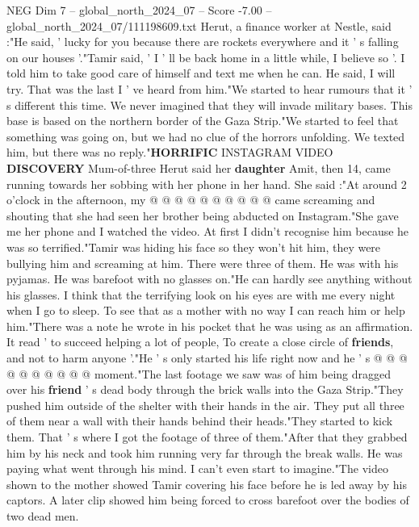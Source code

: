 \begin{textsample}{NEG Dim 7 – global\_north\_2024\_07 – Score -7.00 – global\_north\_2024\_07/111198609.txt}  \label{ex:f7_neg_120}
Herut, a finance worker at Nestle, said :"He said, ' lucky for you because there are rockets everywhere and it ' s falling on our houses '."Tamir said, ' I ' ll be back home in a little while, I believe so '.
I told him to take good care of himself and text me when he can.
He said, I will try.
That was the last I ' ve heard from him."We started to hear rumours that it ' s different this time.
We never imagined that they will invade military bases.
This base is based on the northern border of the Gaza Strip."We started to feel that something was going on, but we had no clue of the horrors unfolding.
We texted him, but there was no reply."\textbf{HORRIFIC} INSTAGRAM VIDEO \textbf{DISCOVERY} Mum-of-three Herut said her \textbf{daughter} Amit, then 14, came running towards her sobbing with her phone in her hand.
She said :"At around 2 o'clock in the afternoon, my @ @ @ @ @ @ @ @ @ @ came screaming and shouting that she had seen her brother being abducted on Instagram."She gave me her phone and I watched the video.
At first I didn't recognise him because he was so terrified."Tamir was hiding his face so they won't hit him, they were bullying him and screaming at him.
There were three of them.
He was with his pyjamas.
He was barefoot with no glasses on."He can hardly see anything without his glasses.
I think that the terrifying look on his eyes are with me every night when I go to sleep.
To see that as a mother with no way I can reach him or help him."There was a note he wrote in his pocket that he was using as an affirmation.
It read ' to succeed helping a lot of people, To create a close circle of \textbf{friends}, and not to harm anyone '."He ' s only started his life right now and he ' s @ @ @ @ @ @ @ @ @ @ moment."The last footage we saw was of him being dragged over his \textbf{friend} ' s dead body through the brick walls into the Gaza Strip."They pushed him outside of the shelter with their hands in the air.
They put all three of them near a wall with their hands behind their heads."They started to kick them.
That ' s where I got the footage of three of them."After that they grabbed him by his neck and took him running very far through the break walls.
He was paying what went through his mind.
I can't even start to imagine."The video shown to the mother showed Tamir covering his face before he is led away by his captors.
A later clip showed him being forced to cross barefoot over the bodies of two dead men.

\end{textsample}
